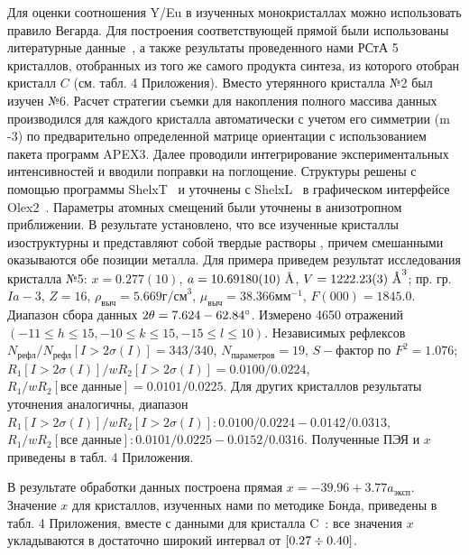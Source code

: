 Для оценки соотношения Y/Eu в изученных монокристаллах можно использовать правило Вегарда.
Для построения соответствующей прямой были использованы литературные данные~\cite{Swanson:1954,Morris:1984,Nikolaev:2023}, а также результаты проведенного нами РСтА 5 кристаллов, отобранных из того же самого продукта синтеза, из которого отобран кристалл $C$ (см. табл. 4 Приложения).
Вместо утерянного кристалла №2 был изучен №6.
Расчет стратегии съемки для накопления полного массива данных производился для каждого кристалла автоматически с учетом его симметрии \hkl(m -3) по предварительно определенной матрице ориентации с использованием пакета программ APEX3.
Далее проводили интегрирование экспериментальных интенсивностей и вводили поправки на поглощение.
Структуры решены с помощью программы ShelxT~\cite{Sheldrick:2015:shelxt} и уточнены с ShelxL~\cite{Sheldrick:2015:shelxl} в графическом интерфейсе Olex2~\cite{Dolomanov:2009}.
Параметры атомных смещений были уточнены в анизотропном приближении.
В результате установлено, что все изученные кристаллы изоструктурны и представляют собой твердые растворы \YEu{}, причем смешанными оказываются обе позиции металла.
Для примера приведем результат исследования кристалла №5: $x = 0.277(10)$, $a = 10.69180(10)\ \text{\AA}$, $V = 1222.23(3)\ \text{\AA}^3$; пр. гр. $Ia-3$, $Z = 16$, $\rho_\text{выч} = 5.669\unit{г/см}^3$, $\mu_\text{выч} = 38.366\unit{мм}^{-1}$, $F(000) = 1845.0$.
Диапазон сбора данных $2\theta = 7.624-62.84^\circ$.
Измерено 4650 отражений $(-11 \leq h \leq 15, -10 \leq k \leq 15, -15 \leq l \leq 10)$.
Независимых рефлексов $N_\text{рефл}/N_\text{рефл} [I > 2\sigma (I)] = 343/340$, $N_\text{параметров} = 19$, $S-\text{фактор}$ по $F^2 = 1.076$; $R_1 [I > 2\sigma (I)]/wR_2 [I > 2\sigma (I)] = 0.0100/0.0224$, $R_1/wR_2 [\text{все данные}] = 0.0101/0.0225$.
Для других кристаллов результаты уточнения аналогичны, диапазон $R_1 [I > 2\sigma (I)]/wR_2 [I > 2\sigma (I)]: 0.0100/0.0224 - 0.0142/0.0313$, $R_1/wR_2 [\text{все данные}]: 0.0101/0.0225 - 0.0152/0.0316$.
Полученные ПЭЯ и $x$ приведены в табл. 4 Приложения.

В результате обработки данных построена прямая $x = -39.96 + 3.77 a_\text{эксп}$.
Значение $x$ для кристаллов, изученных нами по методике Бонда, приведены в табл. 4 Приложения, вместе с данными для кристалла C~\cite{Nikolaev:2023}: все значения $x$ укладываются в достаточно широкий интервал от $[0.27\div0.40]$.
